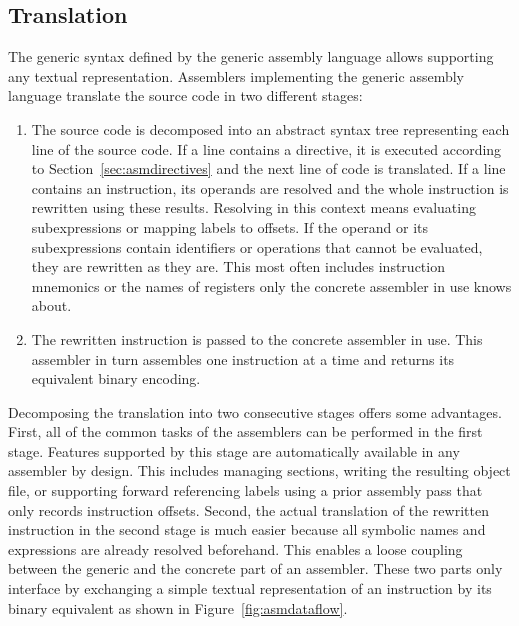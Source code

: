 \subsection{Translation}\label{sec:asmtranslation}

The generic syntax defined by the generic assembly language allows supporting any textual representation.
Assemblers implementing the generic assembly language translate the source code in two different stages:

\begin{enumerate}

\item
The source code is decomposed into an abstract syntax tree representing each line of the source code.
If a line contains a directive, it is executed according to Section~\ref{sec:asmdirectives} and the next line of code is translated.
If a line contains an instruction, its operands are resolved and the whole instruction is rewritten using these results.
Resolving in this context means evaluating subexpressions or mapping labels to offsets.
If the operand or its subexpressions contain identifiers or operations that cannot be evaluated, they are rewritten as they are.
This most often includes instruction mnemonics or the names of registers only the concrete assembler in use knows about.

\item
The rewritten instruction is passed to the concrete assembler in use.
This assembler in turn assembles one instruction at a time and returns its equivalent binary encoding.

\end{enumerate}

Decomposing the translation into two consecutive stages offers some advantages.
First, all of the common tasks of the assemblers can be performed in the first stage.
Features supported by this stage are automatically available in any assembler by design.
This includes managing sections, writing the resulting object file, or supporting forward referencing labels using a prior assembly pass that only records instruction offsets.
Second, the actual translation of the rewritten instruction in the second stage is much easier because all symbolic names and expressions are already resolved beforehand.
This enables a loose coupling between the generic and the concrete part of an assembler.
These two parts only interface by exchanging a simple textual representation of an instruction by its binary equivalent as shown in Figure~\ref{fig:asmdataflow}.

